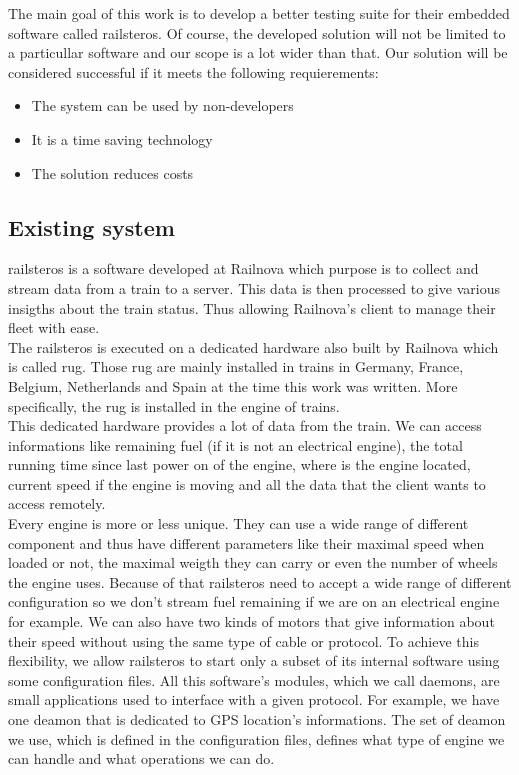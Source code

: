 \documentclass[12pt]{article}
\begin{document}
The main goal of this work is to develop a better testing suite for their embedded software called \gls{railsteros}. Of course, the developed solution will not be limited to a particullar software and our scope is a lot wider than that. Our solution will be considered successful if it meets the following requierements:

\begin{itemize}
\item The system can be used by non-developers
\item It is a time saving technology
\item The solution reduces costs
\end{itemize}

\subsection{Existing system}

\gls{railsteros} is a software developed at Railnova which purpose is to collect and stream data from a train to a server. This data is then processed to give various insigths about the train status. Thus allowing Railnova's client to manage their fleet with ease.\\

The \gls{railsteros} is executed on a dedicated hardware also built by Railnova which is called \gls{rug}. Those \gls{rug} are mainly installed in trains in Germany, France, Belgium, Netherlands and Spain at the time this work was written. More specifically, the \gls{rug} is installed in the engine of trains.\\

This dedicated hardware provides a lot of data from the train. We can access informations like remaining fuel (if it is not an electrical engine), the total running time since last power on of the engine, where is the engine located, current speed if the engine is moving and all the data that the client wants to access remotely.\\

Every engine is more or less unique. They can use a wide range of different component and thus have different parameters like their maximal speed when loaded or not, the maximal weigth they can carry or even the number of wheels the engine uses. Because of that \gls{railsteros} need to accept a wide range of different configuration so we don't stream fuel remaining if we are on an electrical engine for example. We can also have two kinds of motors that give information about their speed without using the same type of cable or protocol. To achieve this flexibility, we allow \gls{railsteros} to start only a subset of its internal software using some configuration files. All this software's modules, which we call \gls{daemons}, are small applications used to interface with a given protocol. For example, we have one deamon that is dedicated to GPS location's informations. The set of deamon we use, which is defined in the configuration files, defines what type of engine we can handle and what operations we can do.\\
\end{document}
